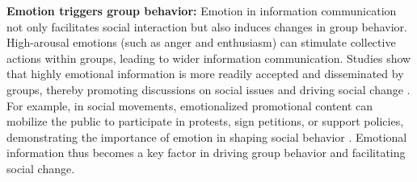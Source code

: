 \textbf{Emotion triggers group behavior:} Emotion in information communication not only facilitates social interaction but also induces changes in group behavior. High-arousal emotions (such as anger and enthusiasm) can stimulate collective actions within groups, leading to wider information communication. Studies show that highly emotional information is more readily accepted and disseminated by groups, thereby promoting discussions on social issues and driving social change \cite{berger2012makes}. For example, in social movements, emotionalized promotional content can mobilize the public to participate in protests, sign petitions, or support policies, demonstrating the importance of emotion in shaping social behavior \cite{de2021sadness}. Emotional information thus becomes a key factor in driving group behavior and facilitating social change.


